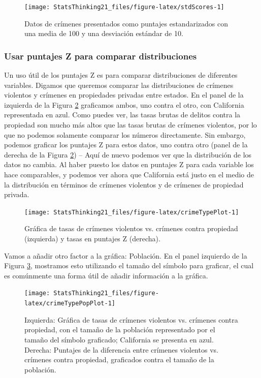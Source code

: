 \documentclass[
  12pt,
]{book}
\begin{document}
\begin{figure}
\texttt{[image: StatsThinking21\_files/figure-latex/stdScores-1]} \caption{Datos de crímenes presentados como puntajes estandarizados con una media de 100 y una desviación estándar de 10.}\label{fig:stdScores}
\end{figure}

\hypertarget{usar-puntajes-z-para-comparar-distribuciones}{%
\subsubsection{Usar puntajes Z para comparar distribuciones}\label{usar-puntajes-z-para-comparar-distribuciones}}

Un uso útil de los puntajes Z es para comparar distribuciones de diferentes variables. Digamos que queremos comparar las distribuciones de crímenes violentos y crímenes en propiedades privadas entre estados. En el panel de la izquierda de la Figura \ref{fig:crimeTypePlot} graficamos ambos, uno contra el otro, con California representada en azul. Como puedes ver, las tasas brutas de delitos contra la propiedad son mucho más altos que las tasas brutas de crímenes violentos, por lo que no podemos solamente comparar los números directamente. Sin embargo, podemos graficar los puntajes Z para estos datos, uno contra otro (panel de la derecha de la Figura \ref{fig:crimeTypePlot}) -- Aquí de nuevo podemos ver que la distribución de los datos no cambia. Al haber puesto los datos en puntajes Z para cada variable los hace comparables, y podemos ver ahora que California está justo en el medio de la distribución en términos de crímenes violentos y de crímenes de propiedad privada.

\begin{figure}
\texttt{[image: StatsThinking21\_files/figure-latex/crimeTypePlot-1]} \caption{Gráfica de tasas de crímenes violentos vs. crímenes contra propiedad (izquierda) y tasas en puntajes Z (derecha).}\label{fig:crimeTypePlot}
\end{figure}

Vamos a añadir otro factor a la gráfica: Población. En el panel izquierdo de la Figura \ref{fig:crimeTypePopPlot}, mostramos esto utilizando el tamaño del símbolo para graficar, el cual es comúnmente una forma útil de añadir información a la gráfica.

\begin{figure}
\texttt{[image: StatsThinking21\_files/figure-latex/crimeTypePopPlot-1]} \caption{Izquierda: Gráfica de tasas de crímenes violentos vs. crímenes contra propiedad, con el tamaño de la población representado por el tamaño del símbolo graficado; California se presenta en azul. Derecha: Puntajes de la diferencia entre crímenes violentos vs. crímenes contra propiedad, graficados contra el tamaño de la población.}\label{fig:crimeTypePopPlot}
\end{figure}
\end{document}
